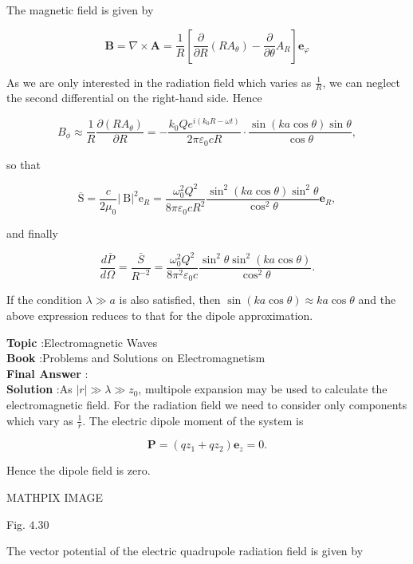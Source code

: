\documentclass[10pt]{article}
\begin{document}
The magnetic field is given by

$$
\mathbf{B}=\nabla \times \mathbf{A}=\frac{1}{R}\left[\frac{\partial}{\partial R}\left(R A_{\theta}\right)-\frac{\partial}{\partial \theta} A_{R}\right] \mathbf{e}_{\varphi}
$$

As we are only interested in the radiation field which varies as $\frac{1}{R}$, we can neglect the second differential on the right-hand side. Hence

$$
B_{\phi} \approx \frac{1}{R} \frac{\partial\left(R A_{\theta}\right)}{\partial R}=-\frac{k_{0} Q e^{i\left(k_{0} R-\omega t\right)}}{2 \pi \varepsilon_{0} c R} \cdot \frac{\sin (k a \cos \theta) \sin \theta}{\cos \theta},
$$

so that

$$
\overline{\mathrm{S}}=\frac{c}{2 \mu_{0}}|\mathrm{~B}|^{2} \mathrm{e}_{R}=\frac{\omega_{0}^{2} Q^{2}}{8 \pi \varepsilon_{0} c R^{2}} \frac{\sin ^{2}(k a \cos \theta) \sin ^{2} \theta}{\cos ^{2} \theta} \mathbf{e}_{R},
$$

and finally

$$
\frac{d \bar{P}}{d \Omega}=\frac{\bar{S}}{R^{-2}}=\frac{\omega_{0}^{2} Q^{2}}{8 \pi^{2} \varepsilon_{0} c} \frac{\sin ^{2} \theta \sin ^{2}(k a \cos \theta)}{\cos ^{2} \theta} .
$$

If the condition $\lambda \gg a$ is also satisfied, then $\sin (k a \cos \theta) \approx k a \cos \theta$ and the above expression reduces to that for the dipole approximation.

\textbf{Topic} :Electromagnetic Waves\\
\textbf{Book} :Problems and Solutions on Electromagnetism\\
\textbf{Final Answer} : \\


\textbf{Solution} :As $|r| \gg \lambda \gg z_{0}$, multipole expansion may be used to calculate the electromagnetic field. For the radiation field we need to consider only components which vary as $\frac{1}{r}$. The electric dipole moment of the system is

$$
\mathbf{P}=\left(q z_{1}+q z_{2}\right) \mathbf{e}_{z}=0 .
$$

Hence the dipole field is zero.

MATHPIX IMAGE

Fig. $4.30$

The vector potential of the electric quadrupole radiation field is given by
\end{document}
